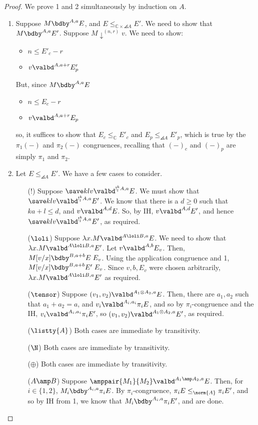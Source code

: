 \weakening*
\begin{proof}
We prove 1 and 2 simultaneously by induction on $A$.
\begin{enumerate}
  \item Suppose $M \bdby^{A,a} E$, and $E \leq_{\mathbb{C} \times \angles{A}} E'$. We need to show that $M \bdby^{A,a} E'$. Suppose $M \downarrow^{(n,r)} v$.
  We need to show:
  \begin{itemize}
    \item $n \leq E'_c - r$
    \item $v \valbd^{A,a+r} E'_p$
  \end{itemize}
  But, since $M \bdby^{A,a} E$
  \begin{itemize}
    \item $n \leq E_c - r$
    \item $v \valbd^{A,a+r} E_p$
  \end{itemize} 
  so, it suffices to show that $E_c \leq_{\mathbb{C}} E'_c$ and $E_p \leq_{\angles A} E'_p$, which is true by the $\pi_1(-)$ and $\pi_2(-)$ congruences, recalling that $(-)_c$ and $(-)_p$ are simply $\pi_1$ and $\pi_2$.
  \item Let $E \leq_{\angles A} E'$. We have a few cases to consider.
  \begin{itemize}
    \item[($!$)] Suppose $\save k l v \valbd^{!^k_l A,a} E$. We must show that $\save k l v \valbd^{!^k_l A,a} E'$. We know that there is a $d \geq 0$ such that $ka+l \leq d$, and $v \valbd^{A,d} E$. So, by IH, $v \valbd^{A,d} E'$, and hence $\save k l v \valbd^{!^k_l A,a} E'$, as required.
    \item[($\loli$)] Suppose $\lambda x.M \valbd^{A\loli B,a} E$. We need to show that $\lambda x.M \valbd^{A\loli B,a} E'$. Let $v \valbd^{A,b} E_v$. Then, $M[v/x] \bdby^{B,a+b} E \; E_v$. Using the application congruence and 1, $M[v/x] \bdby^{B,a+b} E' \; E_v$. Since $v,b,E_v$ were chosen arbitrarily, $\lambda x.M \valbd^{A \loli B,a} E'$ as required.
    \item[($\tensor$)] Suppose $(v_1,v_2) \valbd^{A_1\otimes A_2,a} E$. Then, there are $a_1,a_2$ such that $a_1 + a_2 = a$, and $v_i \valbd^{A_i,a_i} \pi_i E$, and so by $\pi_i$-congruence and the IH, $v_i \valbd^{A_i,a_i} \pi_i E'$, so $(v_1,v_2) \valbd^{A_1\otimes A_2,a} E'$, as required.
    \item[($\listty{A}$)] Both cases are immediate by transitivity.
    \item[($\N$)] Both cases are immediate by transitivity.
    \item[($\oplus$)] Both cases are immediate by transitivity.
    \item[($A \amp B$)] Suppose $\amppair {M_1} {M_2} \valbd^{A_1 \amp A_2,a} E$. Then, for $i \in \{1,2\}$, $M_i \bdby^{A_i,a} \pi_i E$. By $\pi_i$-congruence, $\pi_i E \leq_{\norm{A}} \pi_i E'$, and so by IH from 1, we know that $M_i \bdby^{A_i,a} \pi_i E'$, and are done.
  \end{itemize}
\end{enumerate}
\end{proof}
